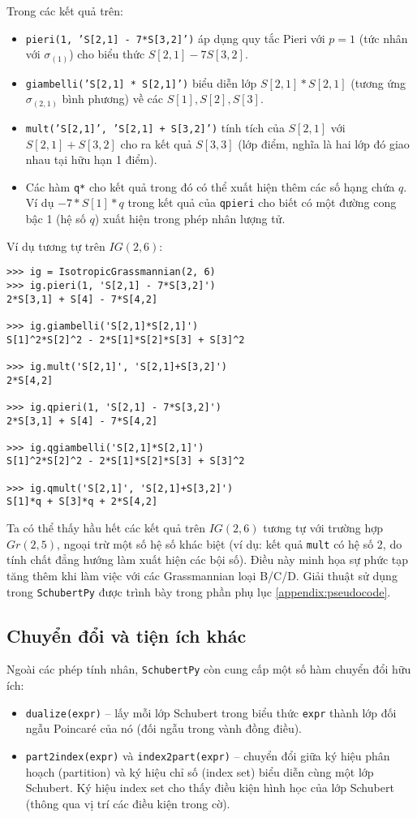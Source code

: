 Trong các kết quả trên:
\begin{itemize}
    \item \texttt{pieri(1, 'S[2,1] - 7*S[3,2]')} áp dụng quy tắc Pieri với $p=1$ (tức nhân với $\sigma_{(1)}$) cho biểu thức $S[2,1] - 7S[3,2]$.
    \item \texttt{giambelli('S[2,1] * S[2,1]')} biểu diễn lớp $S[2,1] * S[2,1]$ (tương ứng $\sigma_{(2,1)}$ bình phương) về các $S[1], S[2], S[3]$.
    \item \texttt{mult('S[2,1]', 'S[2,1] + S[3,2]')} tính tích của $S[2,1]$ với $S[2,1] + S[3,2]$ cho ra kết quả $S[3,3]$ (lớp điểm, nghĩa là hai lớp đó giao nhau tại hữu hạn 1 điểm).
    \item Các hàm \texttt{q*} cho kết quả trong đó có thể xuất hiện thêm các số hạng chứa $q$. Ví dụ $-7*S[1]*q$ trong kết quả của \texttt{qpieri} cho biết có một đường cong bậc 1 (hệ số $q$) xuất hiện trong phép nhân lượng tử.
\end{itemize}

Ví dụ tương tự trên $IG(2,6)$:
\small
\begin{verbatim}
>>> ig = IsotropicGrassmannian(2, 6)
>>> ig.pieri(1, 'S[2,1] - 7*S[3,2]')
2*S[3,1] + S[4] - 7*S[4,2]

>>> ig.giambelli('S[2,1]*S[2,1]')
S[1]^2*S[2]^2 - 2*S[1]*S[2]*S[3] + S[3]^2

>>> ig.mult('S[2,1]', 'S[2,1]+S[3,2]')
2*S[4,2]

>>> ig.qpieri(1, 'S[2,1] - 7*S[3,2]')
2*S[3,1] + S[4] - 7*S[4,2]

>>> ig.qgiambelli('S[2,1]*S[2,1]')
S[1]^2*S[2]^2 - 2*S[1]*S[2]*S[3] + S[3]^2

>>> ig.qmult('S[2,1]', 'S[2,1]+S[3,2]')
S[1]*q + S[3]*q + 2*S[4,2]
\end{verbatim}
\normalsize

Ta có thể thấy hầu hết các kết quả trên $IG(2,6)$ tương tự với trường hợp $Gr(2,5)$, ngoại trừ một số hệ số khác biệt (ví dụ: kết quả \texttt{mult} có hệ số 2, do tính chất đẳng hướng làm xuất hiện các bội số). Điều này minh họa sự phức tạp tăng thêm khi làm việc với các Grassmannian loại B/C/D. Giải thuật sử dụng trong \texttt{SchubertPy} được trình bày trong phần phụ lục \ref{appendix:pseudocode}.


\subsection{Chuyển đổi và tiện ích khác}
Ngoài các phép tính nhân, \texttt{SchubertPy} còn cung cấp một số hàm chuyển đổi hữu ích:
\begin{itemize}
    \item \texttt{dualize(expr)} – lấy mỗi lớp Schubert trong biểu thức \texttt{expr} thành lớp đối ngẫu Poincaré của nó (đối ngẫu trong vành đồng điều).
    \item \texttt{part2index(expr)} và \texttt{index2part(expr)} – chuyển đổi giữa ký hiệu phân hoạch (partition) và ký hiệu chỉ số (index set) biểu diễn cùng một lớp Schubert. Ký hiệu index set cho thấy điều kiện hình học của lớp Schubert (thông qua vị trí các điều kiện trong cờ).
\end{itemize}

